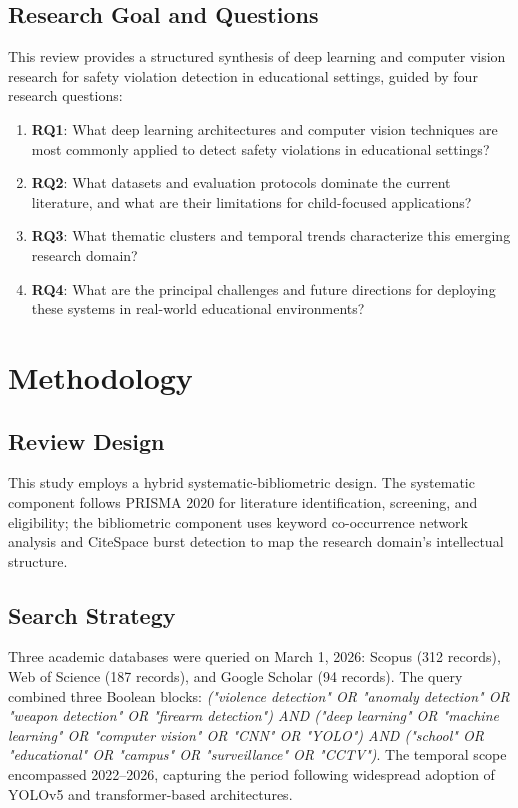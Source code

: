 \documentclass[conference]{IEEEtran}
\begin{document}
\subsection{Research Goal and Questions}

This review provides a structured synthesis of deep learning and computer vision research for safety violation detection in educational settings, guided by four research questions:

\begin{enumerate}
\item \textbf{RQ1}: What deep learning architectures and computer vision techniques are most commonly applied to detect safety violations in educational settings?
\item \textbf{RQ2}: What datasets and evaluation protocols dominate the current literature, and what are their limitations for child-focused applications?
\item \textbf{RQ3}: What thematic clusters and temporal trends characterize this emerging research domain?
\item \textbf{RQ4}: What are the principal challenges and future directions for deploying these systems in real-world educational environments?
\end{enumerate}

\section{Methodology}

\subsection{Review Design}

This study employs a hybrid systematic-bibliometric design. The systematic component follows PRISMA 2020 for literature identification, screening, and eligibility; the bibliometric component uses keyword co-occurrence network analysis and CiteSpace burst detection to map the research domain's intellectual structure.

\subsection{Search Strategy}

Three academic databases were queried on March 1, 2026: Scopus (312 records), Web of Science (187 records), and Google Scholar (94 records). The query combined three Boolean blocks: \textit{("violence detection" OR "anomaly detection" OR "weapon detection" OR "firearm detection") AND ("deep learning" OR "machine learning" OR "computer vision" OR "CNN" OR "YOLO") AND ("school" OR "educational" OR "campus" OR "surveillance" OR "CCTV")}. The temporal scope encompassed 2022--2026, capturing the period following widespread adoption of YOLOv5 and transformer-based architectures.
\end{document}
